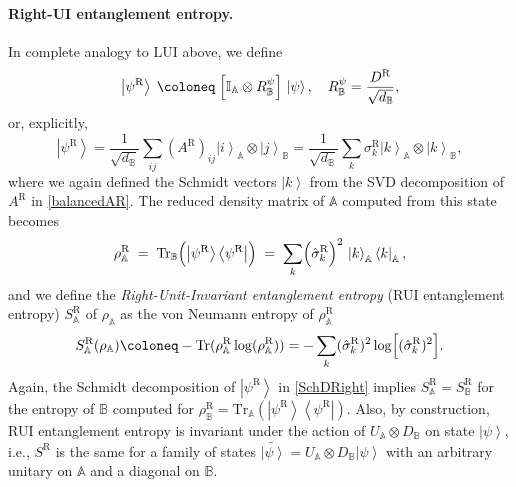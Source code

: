 \documentclass[11pt,a4paper]{article}
\newcommand{\be}{\begin{equation}}
\newcommand{\ee}{\end{equation}}
\newcommand{\Tr}{\text{Tr}}
\newcommand{\ket}[1]{\left|#1\right\rangle}
\newcommand{\bra}[1]{\left\langle#1\right|}
\begin{document}
\paragraph{Right-UI entanglement entropy.} In complete analogy to LUI above, we define 
\begin{equation}
 \ket{\psi^\mathrm{R}} \;\coloneq \; \Bigl[\mathbb I_\mathbb{A}\otimes R^\psi_\mathbb{B}\Bigr]\,\ket{\psi}, \quad R^\psi_\mathbb{B} 
 = \frac{{{D^\mathrm{R}}}}{\sqrt{d_\mathbb{B}}},
 \label{eq:balanced-right}
\end{equation}
or, explicitly,
\be
\ket{\psi^\mathrm{R}}=\frac{1}{\sqrt{d_\mathbb{B}}}\sum_{ij}(A^{\mathrm R})_{ij}\ket{i}_\mathbb{A}\otimes \ket{j}_\mathbb{B}= \frac{1}{\sqrt{d_\mathbb{B}}}\sum_{k}\sigma^{\mathrm R}_k\ket{k}_\mathbb{A}\otimes \ket{k}_\mathbb{B},\label{SchDRight}
\ee
where we again defined the Schmidt vectors $\ket{k}$ from the SVD decomposition of $A^{\mathrm R}$ in \cref{balancedAR}. The reduced density matrix of $\mathbb{A}$ computed from this state becomes
\begin{equation}
 \rho^\mathrm{R}_\mathbb{A} \;=\; \mathrm{Tr}_\mathbb{B}\Bigl(\ket{\psi^\mathrm{R}}\bra{\psi^\mathrm{R}}\Bigr)
 \;=\; \sum_{k} \Bigl(\hat{\sigma}_k^\mathrm{R}\Bigr)^2\, \ket{k}_\mathbb{A}\bra{k}_\mathbb{A},
 \label{eq:rhoA-right}
\end{equation}
and we define the \textit{Right-Unit-Invariant entanglement entropy} (RUI entanglement entropy) $S^\mathrm{R}_\mathbb{A}$ of $\rho_\mathbb{A}$ as the von Neumann entropy of $\rho^\mathrm{R}_\mathbb{A}$
\begin{equation}
 S^\mathrm{R}_\mathbb{A}(\rho_\mathbb{A})\coloneq -\Tr(\rho^\mathrm{R}_\mathbb{A}\log(\rho^\mathrm{R}_\mathbb{A}))= -\sum_{k} (\hat{\sigma}_k^\mathrm{R})^2 \log\Bigl[(\hat{\sigma}_k^\mathrm{R})^2\Bigr].
 \label{eq:entropy-right}
\end{equation}
Again, the Schmidt decomposition of $\ket{\psi^\mathrm{R}}$ in \cref{SchDRight} implies $S^\mathrm{R}_\mathbb{A}=S^\mathrm{R}_\mathbb{B}$ for the entropy of $\mathbb{B}$ computed for $\rho^\mathrm{R}_\mathbb{B}=\Tr_\mathbb{A}(\ket{\psi^\mathrm{R}}\bra{\psi^\mathrm{R}})$. Also, by construction, RUI entanglement entropy is invariant under the action of $U_\mathbb{A} \otimes D_\mathbb{B}$ on state $\ket{\psi}$, i.e., $S^\mathrm{R}$ is the same for a family of states $\tilde{\ket{\psi}}=U_\mathbb{A} \otimes D_\mathbb{B}\ket{\psi}$ with an arbitrary unitary on $\mathbb{A}$ and a diagonal on $\mathbb{B}$.
\end{document}
